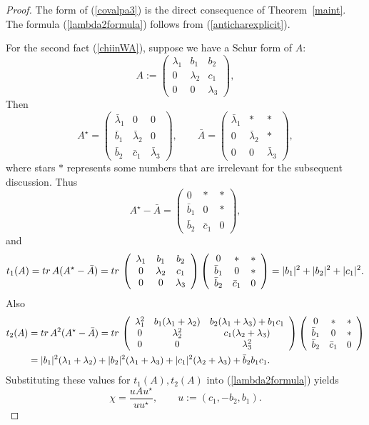 \documentclass[10pt,a4paper]{amsart}
\newcommand{\tr}{{\rm tr}\,}
\newcommand{\zav}[1]{\left( #1 \right)}
\begin{document}
\begin{proof}
The form of (\ref{covalpa3}) is the direct consequence of Theorem~\ref{maint}. The formula (\ref{lambda2formula}) follows from (\ref{anticharexplicit}).

For the second fact (\ref{chiinWA}), suppose we have a Schur form of $A$:
$$
A:=\zav{\begin{array}{ccc}
\lambda_1 & b_1 & b_2 \\
0 & \lambda_2 & c_1 \\
0 & 0 & \lambda_3 
\end{array}
},
$$
Then
$$
A^\star=\zav{\begin{array}{ccc}
\bar \lambda_1 & 0 & 0 \\
\bar b_1 & \bar \lambda_2 & 0 \\
\bar b_2 & \bar c_1 & \bar \lambda_3 
\end{array}
},
\qquad
\bar A=\zav{\begin{array}{ccc}
\bar \lambda_1 & * & * \\
0 & \bar \lambda_2 & * \\
0 & 0 & \bar \lambda_3 
\end{array}
},
$$
where stars $*$ represents some numbers that are irrelevant for the subsequent discussion.
Thus
$$
A^\star-\bar A =\zav{\begin{array}{ccc}
0 & * & * \\
\bar b_1 & 0 & * \\
\bar b_2 & \bar c_1 & 0 
\end{array}
},
$$
and
$$
t_1(A)=\tr A(A^\star-\bar A)=\tr \zav{\begin{array}{ccc}
\lambda_1 & b_1 & b_2 \\
0 & \lambda_2 & c_1 \\
0 & 0 & \lambda_3 
\end{array}
}\zav{\begin{array}{ccc}
0 & * & * \\
\bar b_1 & 0 & * \\
\bar b_2 & \bar c_1 & 0 
\end{array}
}=|b_1|^2+|b_2|^2+|c_1|^2.
$$
Also
\begin{align*}
t_2(A)&=\tr A^2(A^\star-\bar A)=\tr \zav{\begin{array}{ccc}
\lambda_1^2 & b_1(\lambda_1+\lambda_2) & b_2(\lambda_1+\lambda_3)+b_1c_1 \\
0 & \lambda_2^2 & c_1(\lambda_2+\lambda_3) \\
0 & 0 & \lambda_3^2 
\end{array}
}\zav{\begin{array}{ccc}
0 & * & * \\
\bar b_1 & 0 & * \\
\bar b_2 & \bar c_1 & 0 
\end{array}
}\\
&=|b_1|^2(\lambda_1+\lambda_2)+|b_2|^2(\lambda_1+\lambda_3)+|c_1|^2(\lambda_2+\lambda_3)+\bar b_2 b_1 c_1.
\end{align*}
Substituting these values for $t_1(A), t_2(A)$ into (\ref{lambda2formula}) yields
\begin{equation}\label{chiexplicit}
\chi=\frac{u A u^\star}{u u^\star},\qquad u:=(c_1,-b_2,b_1).
\end{equation}
\end{proof}
\end{document}
